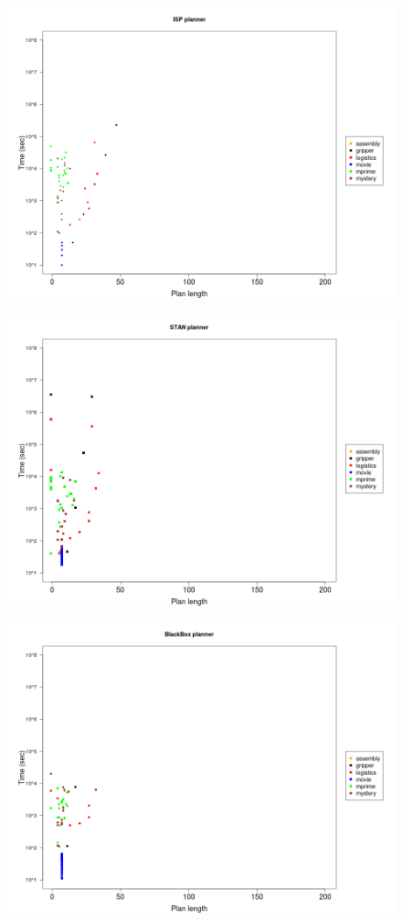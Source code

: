 \documentclass[handout,t]{beamer}
\begin{document}
\begin{frame}
  \begin{figure}[ht!]
    \centering
    \includegraphics[width=0.75\linewidth]{bxplt_ISP_Time_length}
    \label{fig::figura6} 
  \end{figure}        
\end{frame}

\begin{frame}
  \begin{figure}[ht!]
    \centering
    \includegraphics[width=0.75\linewidth]{bxplt_STAN_Time_length}
    \label{fig::figura7} 
  \end{figure}        
\end{frame}

\begin{frame}
  \begin{figure}[ht!]
    \centering
    \includegraphics[width=0.75\linewidth]{bxplt_BB_Time_length}
    \label{fig::figura8} 
  \end{figure}        
\end{frame}
\end{document}

